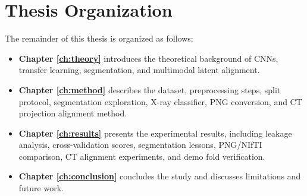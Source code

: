\section{Thesis Organization}
The remainder of this thesis is organized as follows:
\begin{itemize}
    \item \textbf{Chapter \ref{ch:theory}} introduces the theoretical background of CNNs, transfer learning, segmentation, and multimodal latent alignment.
    \item \textbf{Chapter \ref{ch:method}} describes the dataset, preprocessing steps, split protocol, segmentation exploration, X-ray classifier, PNG conversion, and CT projection alignment method.
    \item \textbf{Chapter \ref{ch:results}} presents the experimental results, including leakage analysis, cross-validation scores, segmentation lessons, PNG/NIfTI comparison, CT alignment experiments, and demo fold verification.
    \item \textbf{Chapter \ref{ch:conclusion}} concludes the study and discusses limitations and future work.
\end{itemize}

